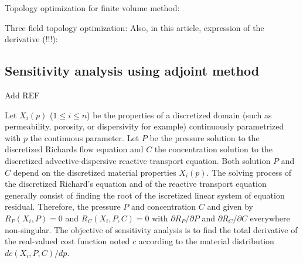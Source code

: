\documentclass[11pt]{article}
\begin{document}
Topology optimization for finite volume method: 

Three field topology optimization:
Also, in this article, expression of the derivative (!!!):



\subsection{Sensitivity analysis using adjoint method}

Add REF

Let $X_i(p)$ ($1 \leq i \leq n$) be the properties of a discretized domain (such as permeability, porosity, or dispersivity for example) continuously parametrized with $p$ the continuous parameter.
Let $P$ be the pressure solution to the discretized Richards flow equation and $C$ the concentration solution to the discretized advective-dispersive reactive transport equation. Both solution $P$ and $C$ depend on the discretized material properties $X_i(p)$.
The solving process of the discretized Richard's equation and of the reactive transport equation generally consist of finding the root of the iscretized linear system of equation residual. Therefore, the pressure $P$ and concentration $C$ and given by $R_P(X_i, P)=0$ and $R_C(X_i, P, C)=0$ with $\partial R_P / \partial P$ and $\partial R_C / \partial C$ everywhere non-singular.
The objective of sensitivity analysis is to find the total derivative of the real-valued cost function noted $c$ according to the material distribution $dc\left(X_i, P, C\right) / dp$.
\end{document}
